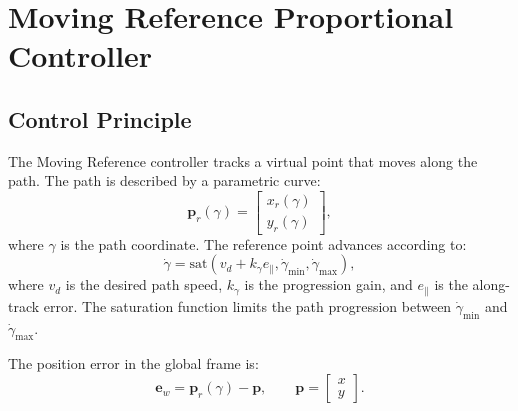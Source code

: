 \section{Moving Reference Proportional Controller}
\label{sec:moving_reference_controller}

\subsection{Control Principle}

The Moving Reference controller tracks a virtual point that moves along the
path. The path is described by a parametric curve:
\begin{equation}
    \mathbf{p}_{r}(\gamma)
    =
    \begin{bmatrix}
        x_r(\gamma) \\
        y_r(\gamma)
    \end{bmatrix},
\end{equation}
where \(\gamma\) is the path coordinate. The reference point advances according
to:
\begin{equation}
    \dot{\gamma}
    =
    \mathrm{sat}
    \left(
        v_d + k_{\gamma} e_{\parallel},
        \dot{\gamma}_{\min},
        \dot{\gamma}_{\max}
    \right),
\end{equation}
where \(v_d\) is the desired path speed, \(k_{\gamma}\) is the progression gain,
and \(e_{\parallel}\) is the along-track error. The saturation function limits
the path progression between \(\dot{\gamma}_{\min}\) and
\(\dot{\gamma}_{\max}\).

\vspace{0.2cm}

The position error in the global frame is:
\begin{equation}
    \mathbf{e}_{w}
    =
    \mathbf{p}_{r}(\gamma)
    -
    \mathbf{p},
    \qquad
    \mathbf{p}
    =
    \begin{bmatrix}
        x \\
        y
    \end{bmatrix}.
\end{equation}


